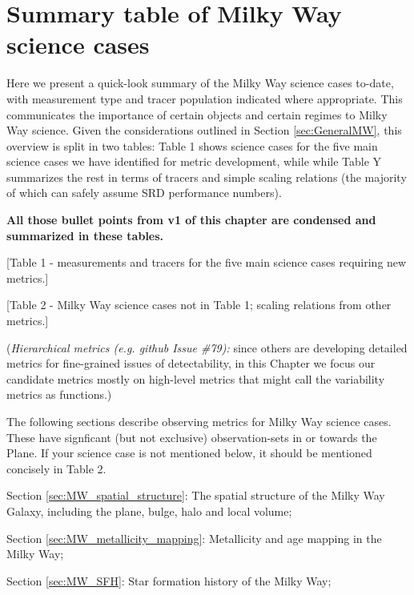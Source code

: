 \section{Summary table of Milky Way science cases}
\def\secname{SummaryTableMW}\label{sec:\secname}

Here we present a quick-look summary of the Milky Way science cases
to-date, with measurement type and tracer population indicated where
appropriate. This communicates the importance of certain objects and
certain regimes to Milky Way science. Given the considerations
outlined in Section \ref{sec:GeneralMW}, this overview is split in two
tables: Table 1 shows science cases for the five main science cases we
have identified for metric development, while while Table Y summarizes
the rest in terms of tracers and simple scaling relations (the
majority of which can safely assume SRD performance numbers).

{\bf All those bullet points from v1 of this chapter are condensed and summarized in these tables.}

[Table 1 - measurements and tracers for the five main science cases requiring new metrics.]

[Table 2 - Milky Way science cases not in Table 1; scaling relations from other metrics.]

({\it Hierarchical metrics (e.g. github Issue \#79):} since others are
developing detailed metrics for fine-grained issues of detectability,
in this Chapter we focus our candidate metrics mostly on high-level
metrics that might call the variability metrics as functions.) 

The following sections describe observing metrics for Milky Way
science cases. These have signficant (but not exclusive)
observation-sets in or towards the Plane. If your science case is not
mentioned below, it should be mentioned concisely in Table 2.



Section \ref{sec:MW_spatial_structure}: The spatial structure of the Milky Way Galaxy, including the plane, bulge, halo and local volume;

Section \ref{sec:MW_metallicity_mapping}: Metallicity and age mapping in the Milky Way; 

Section \ref{sec:MW_SFH}: Star formation history of the Milky Way;


